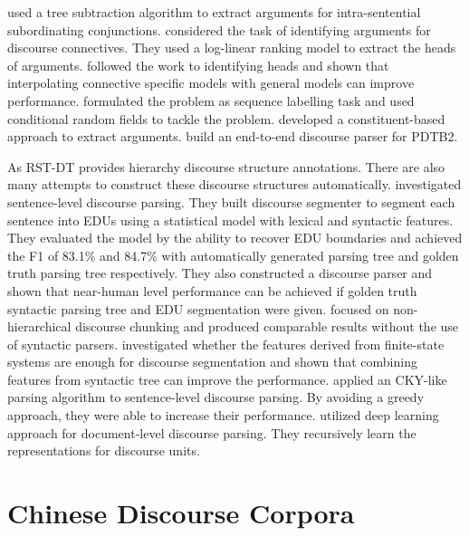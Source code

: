 \cite{dines2005attribution} used a tree subtraction algorithm to extract arguments for
intra-sentential subordinating conjunctions. \cite{wellner2007auto} considered the task of identifying
arguments for discourse connectives. They used a log-linear ranking model to extract the heads of arguments.
\cite{elwell2008discourse} followed the work to identifying heads and  shown that
interpolating connective specific models with general models can improve performance.
\cite{ghosh2011shallow,ghosh2012global} formulated the problem as sequence labelling task
and used conditional random fields to tackle the problem.
\cite{kong2014a} developed a constituent-based approach to extract arguments.
\cite{lin2014pdtb} build an end-to-end discourse parser for PDTB2.


As RST-DT provides hierarchy discourse structure annotations. There are also many
attempts to construct these discourse structures automatically. \cite{soricut2003sentence}
investigated sentence-level discourse parsing. They built discourse segmenter to
segment each sentence into EDUs using a statistical model with lexical and syntactic features.
They evaluated the model by the ability to recover EDU boundaries and achieved the F1 of
83.1\% and 84.7\% with automatically generated parsing tree and golden truth parsing tree respectively.
They also constructed a discourse parser and shown that near-human level performance can be achieved
if golden truth syntactic parsing tree and EDU segmentation were given. \cite{sporleder2005} focused
on non-hierarchical discourse chunking and produced comparable results without the use of
syntactic parsers. \cite{fisher2007utility} investigated whether the features derived from finite-state
systems are enough for discourse segmentation and shown that combining features from syntactic tree
can improve the performance. \cite{joty2012novel} applied an CKY-like parsing algorithm
to sentence-level discourse parsing. By avoiding a greedy approach, they were able to increase
their performance. \cite{li2014recursive} utilized deep learning approach for document-level 
discourse parsing. They recursively learn the representations for discourse units.


\section{Chinese Discourse Corpora}

